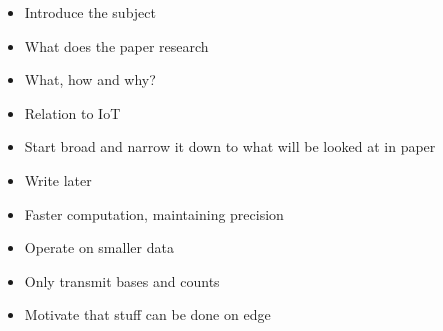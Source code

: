 \begin{itemize}
    \item Introduce the subject
    \item What does the paper research
    \item What, how and why?
    \item Relation to IoT 
    \item Start broad and narrow it down to what will be looked at in paper
    \item Write later
    \item Faster computation, maintaining precision
    \item Operate on smaller data
    \item Only transmit bases and counts 
    \item Motivate that stuff can be done on edge 
\end{itemize}
